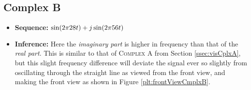 \documentclass[../../course]{subfiles}
\begin{document}
\subsection{Complex B} \label{ssec:visCplxB}

\begin{itemize} [label=]

    \item \textbf{Sequence:} $\sin(2 \pi 28 t) + j \sin(2 \pi 56 t)$

    \item \textbf{Inference:} Here the \emph{imaginary part} is higher in frequency than
        that of the \emph{real part}. This is similar to that of \textsc{Complex A} from
        Section \ref{ssec:visCplxA}, but this slight frequency difference will deviate the
        signal ever so slightly from oscillating through the straight line as viewed from
        the front view, and making the front view as shown in Figure \ref{plt:frontViewCmplxB}.

\end{itemize}

\vfill
\end{document}
